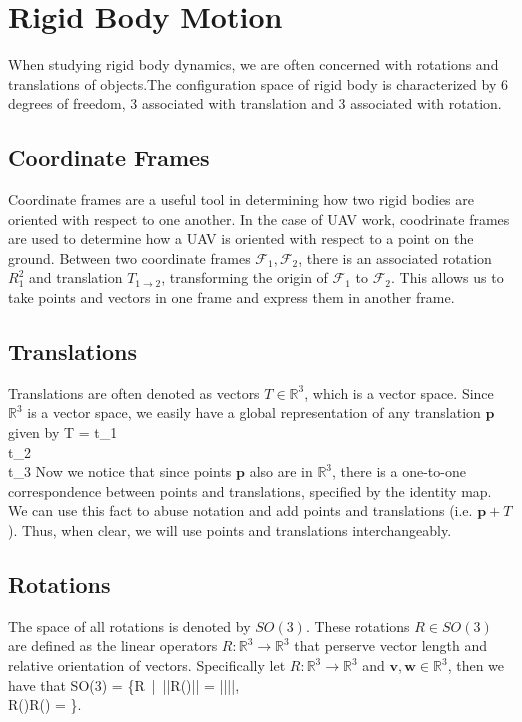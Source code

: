 
\section{Rigid Body Motion}
When studying rigid body dynamics, we are often concerned with rotations and translations of objects.The configuration space of rigid body is characterized by 6 degrees of freedom, 3 associated with translation and 3 associated with rotation.

\subsection{Coordinate Frames}
Coordinate frames are a useful tool in determining how two rigid bodies are oriented with respect to one another. In the case of UAV work, coodrinate frames are used to determine how a UAV is oriented with respect to a point on the ground. Between two coordinate frames $\mathcal{F}_1, \mathcal{F}_2$, there is an associated rotation $R_1^{2}$ and translation $T_{1 \rightarrow 2}$, transforming the origin of $\mathcal{F}_1$ to $\mathcal{F}_2$. This allows us to take points and vectors in one frame and express them in another frame.

\subsection{Translations}
Translations are often denoted as vectors $T \in \mathbb{R}^3$, which is a vector space. Since $\mathbb{R}^3$ is a vector space, we easily have a global representation of any translation $\mathbf{p}$ given by
\beq
T =
\bma
t_1 \\
t_2 \\
t_3
\ema
\eeq
Now we notice that since points $\mathbf{p}$ also are in $\mathbb{R}^3$, there is a one-to-one correspondence between points and translations, specified by the identity map. We can use this fact to abuse notation and add points and translations (i.e. $\mathbf{p} + T$). Thus, when clear, we will use points and translations interchangeably. 

\subsection{Rotations}
The space of all rotations is denoted by $SO(3)$. These rotations $R \in SO(3)$ are defined as the linear operators $R:\mathbb{R}^3 \rightarrow \mathbb{R}^3$ that perserve vector length and relative orientation of vectors. Specifically let $R:\mathbb{R}^3 \rightarrow \mathbb{R}^3$ and $\mathbf{v},\mathbf{w} \in \mathbb{R}^3$, then we have that
\beq
SO(3) = \{R\ |\ ||R()|| = ||||, \\R()\times R() =  \times {} \}.
\eeq

